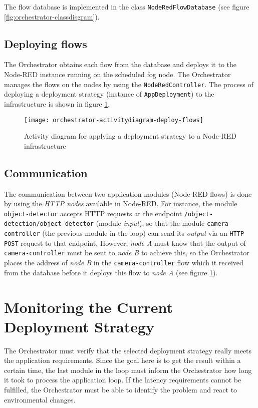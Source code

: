 The flow database is implemented in the class \texttt{NodeRedFlowDatabase} (see figure \ref{fig:orchestrator-classdisgram}).

\subsection*{Deploying flows}
The Orchestrator obtains each flow from the database and deploys it to the Node-RED instance running on the scheduled fog node.
The Orchestrator manages the flows on the nodes by using the \texttt{NodeRedController}.
The process of deploying a deployment strategy (instance of \texttt{AppDeployment}) to the infrastructure is shown in figure \ref{fig:orchestrator-activitydiagram-deploy-flows}.

\begin{figure}[htb]
    \centering
    \texttt{[image: orchestrator-activitydiagram-deploy-flows]}
    \caption{Activity diagram for applying a deployment strategy to a Node-RED infrastructure}
    \label{fig:orchestrator-activitydiagram-deploy-flows}
\end{figure}

\subsection*{Communication}
The communication between two application modules (Node-RED flows) is done by using the \textit{HTTP nodes} available in Node-RED.
For instance, the module \texttt{object-detector} accepts HTTP requests at the endpoint \texttt{/object-detection/object-detector} (module \textit{input}), so that the module \texttt{camera-controller} (the previous module in the loop) can send its \textit{output} via an \texttt{HTTP POST} request to that endpoint.
However, \textit{node A} must know that the output of \texttt{camera-controller} must be sent to \textit{node B} to achieve this, so the Orchestrator places the address of \textit{node B} in the \texttt{camera-controller} flow which it received from the database before it deploys this flow to \textit{node A} (see figure \ref{fig:orchestrator-activitydiagram-deploy-flows}).

\section{Monitoring the Current Deployment Strategy\label{sec:orchestrator-monitoring-deployment-strategy}}

The Orchestrator must verify that the selected deployment strategy really meets the application requirements.
Since the goal here is to get the result within a certain time, the last module in the loop must inform the Orchestrator how long it took to process the application loop.
If the latency requirements cannot be fulfilled, the Orchestrator must be able to identify the problem and react to environmental changes.

